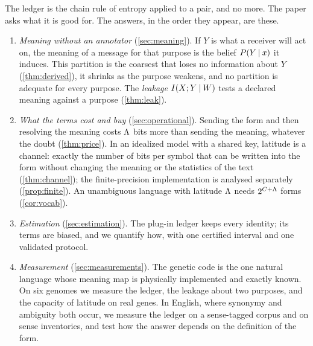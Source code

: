 The ledger is the chain rule of entropy applied to a pair, and no more. The paper asks what it is good for. The answers, in the order they appear, are these.
\begin{enumerate}
\item \emph{Meaning without an annotator} (\cref{sec:meaning}). If $Y$ is what a receiver will act on, the meaning of a message for that purpose is the belief $P(Y\mathbin{\vert} x)$ it induces. This partition is the coarsest that loses no information about $Y$ (\cref{thm:derived}), it shrinks as the purpose weakens, and no partition is adequate for every purpose. The \emph{leakage} $I(X;Y\mathbin{\vert} W)$ tests a declared meaning against a purpose (\cref{thm:leak}).
\item \emph{What the terms cost and buy} (\cref{sec:operational}). Sending the form and then resolving the meaning costs $\Lambda$ bits more than sending the meaning, whatever the doubt (\cref{thm:price}). In an idealized model with a shared key, latitude is a channel: exactly the number of bits per symbol that can be written into the form without changing the meaning or the statistics of the text (\cref{thm:channel}); the finite-precision implementation is analysed separately (\cref{prop:finite}). An unambiguous language with latitude $\Lambda$ needs $2^{C+\Lambda}$ forms (\cref{cor:vocab}).
\item \emph{Estimation} (\cref{sec:estimation}). The plug-in ledger keeps every identity; its terms are biased, and we quantify how, with one certified interval and one validated protocol.
\item \emph{Measurement} (\cref{sec:measurements}). The genetic code is the one natural language whose meaning map is physically implemented and exactly known. On six genomes we measure the ledger, the leakage about two purposes, and the capacity of latitude on real genes. In English, where synonymy and ambiguity both occur, we measure the ledger on a sense-tagged corpus and on sense inventories, and test how the answer depends on the definition of the form.
\end{enumerate}
